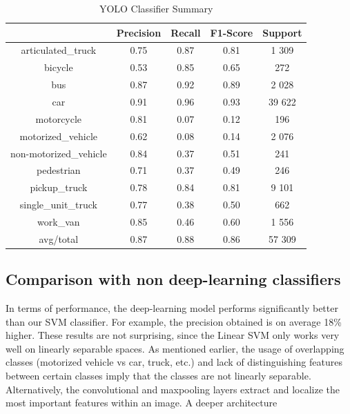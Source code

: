 \documentclass[12pt]{article}
\begin{document}
\begin{table}[H] 
    \centering
        \begin{tabular}{ | c | c | c | c | c |}
        \hline
                                   & Precision & Recall & F1-Score & Support \\
                                   \hline
            articulated\_truck     & 0.75      & 0.87   & 0.81     & 1 309    \\
            bicycle                & 0.53      & 0.85   & 0.65     & 272     \\
            bus                    & 0.87      & 0.92   & 0.89     & 2 028    \\
            car                    & 0.91      & 0.96   & 0.93     & 39 622   \\
            motorcycle             & 0.81      & 0.07   & 0.12     & 196     \\
            motorized\_vehicle     & 0.62      & 0.08   & 0.14     & 2 076    \\
            non-motorized\_vehicle & 0.84      & 0.37   & 0.51     & 241     \\
            pedestrian             & 0.71      & 0.37   & 0.49     & 246     \\
            pickup\_truck          & 0.78      & 0.84   & 0.81     & 9 101    \\
            single\_unit\_truck    & 0.77      & 0.38   & 0.50     & 662     \\
            work\_van              & 0.85      & 0.46   & 0.60     & 1 556    \\
            \hline
            avg/total              & 0.87      & 0.88   & 0.86     & 57 309   \\
            \hline
        \end{tabular}
    \caption{YOLO Classifier Summary}
    \label{table:clf_results}
    \end{table}

\subsection{Comparison with non deep-learning classifiers} 
In terms of performance, the deep-learning model  performs significantly better than our SVM classifier. For example, the precision obtained is on average 18\% higher. These results are not surprising, since the Linear SVM only works very well on linearly separable spaces. As mentioned earlier, the usage of overlapping classes (motorized vehicle vs car, truck, etc.) and lack of distinguishing features between certain classes imply that the classes are not linearly separable. Alternatively, the convolutional and maxpooling layers extract and localize the most important features within an image. A deeper architecture 
\end{document}
